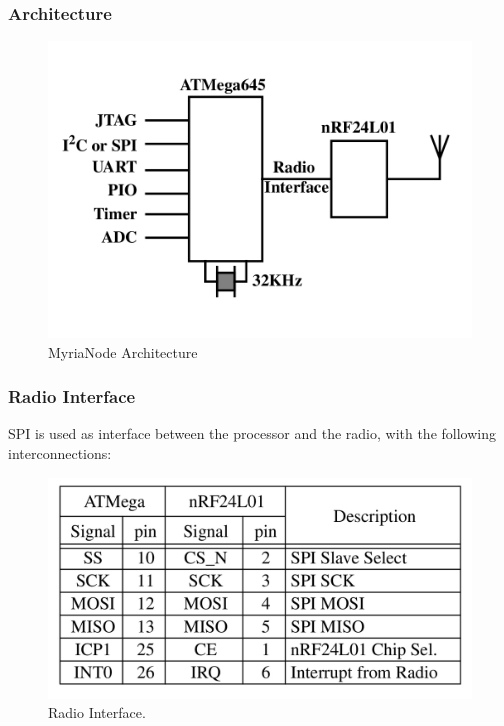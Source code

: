 \documentclass[a4paper,10pt]{report}
\begin{document}
\subsubsection{Architecture}
\begin{figure}[!h]
 \centering
 \includegraphics[width=0.5 \textwidth]{myrianodearch}
\caption{MyriaNode Architecture}
\label{myrianodearch}
\end{figure}
\subsubsection{Radio Interface}
SPI is used as interface between the processor and the radio, with the following interconnections:
\begin{figure}[!h]
 \centering
 \includegraphics[width = 0.7 \textwidth] {table1}
 \caption{Radio Interface.}
 \label{table1}
\end{figure}
\end{document}
